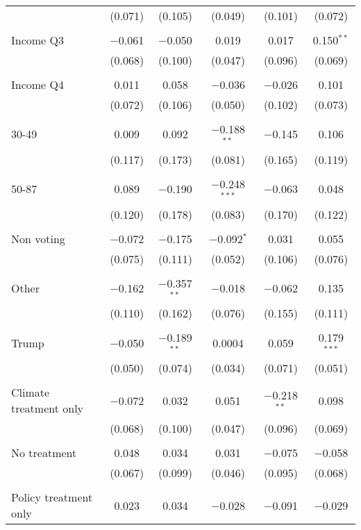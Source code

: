 \begin{tabular}{@{\extracolsep{5pt}}lccccc}
  & (0.071) & (0.105) & (0.049) & (0.101) & (0.072) \\ 
  & & & & & \\ 
 Income Q3 & $-$0.061 & $-$0.050 & 0.019 & 0.017 & 0.150$^{**}$ \\ 
  & (0.068) & (0.100) & (0.047) & (0.096) & (0.069) \\ 
  & & & & & \\ 
 Income Q4 & 0.011 & 0.058 & $-$0.036 & $-$0.026 & 0.101 \\ 
  & (0.072) & (0.106) & (0.050) & (0.102) & (0.073) \\ 
  & & & & & \\ 
 30-49 & 0.009 & 0.092 & $-$0.188$^{**}$ & $-$0.145 & 0.106 \\ 
  & (0.117) & (0.173) & (0.081) & (0.165) & (0.119) \\ 
  & & & & & \\ 
 50-87 & 0.089 & $-$0.190 & $-$0.248$^{***}$ & $-$0.063 & 0.048 \\ 
  & (0.120) & (0.178) & (0.083) & (0.170) & (0.122) \\ 
  & & & & & \\ 
 Non voting & $-$0.072 & $-$0.175 & $-$0.092$^{*}$ & 0.031 & 0.055 \\ 
  & (0.075) & (0.111) & (0.052) & (0.106) & (0.076) \\ 
  & & & & & \\ 
 Other & $-$0.162 & $-$0.357$^{**}$ & $-$0.018 & $-$0.062 & 0.135 \\ 
  & (0.110) & (0.162) & (0.076) & (0.155) & (0.111) \\ 
  & & & & & \\ 
 Trump & $-$0.050 & $-$0.189$^{**}$ & 0.0004 & 0.059 & 0.179$^{***}$ \\ 
  & (0.050) & (0.074) & (0.034) & (0.071) & (0.051) \\ 
  & & & & & \\ 
 Climate treatment only & $-$0.072 & 0.032 & 0.051 & $-$0.218$^{**}$ & 0.098 \\ 
  & (0.068) & (0.100) & (0.047) & (0.096) & (0.069) \\ 
  & & & & & \\ 
 No treatment & 0.048 & 0.034 & 0.031 & $-$0.075 & $-$0.058 \\ 
  & (0.067) & (0.099) & (0.046) & (0.095) & (0.068) \\ 
  & & & & & \\ 
 Policy treatment only & 0.023 & 0.034 & $-$0.028 & $-$0.091 & $-$0.029 \\ 

\end{tabular}
